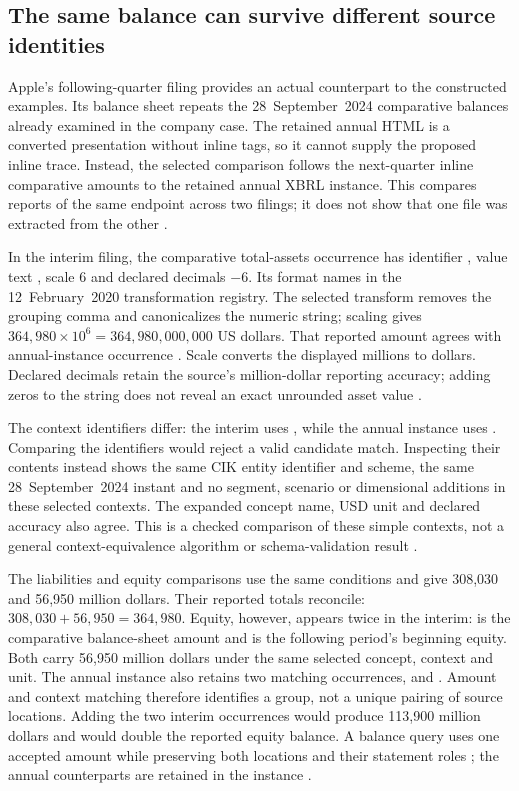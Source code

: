 \subsection{The same balance can survive different source identities}

Apple's following-quarter filing provides an actual counterpart to the
constructed examples. Its balance sheet repeats the 28~September~2024
comparative balances already examined in the company case. The retained
annual HTML is a converted presentation without inline tags, so it cannot
supply the proposed inline trace. Instead, the selected comparison follows
the next-quarter inline comparative amounts to the retained annual XBRL
instance. This compares reports of the same endpoint across two filings; it
does not show that one file was extracted from the other
\citep{apple2025q1,apple2024xbrlinstance,apple2024convertedhtml}.

In the interim filing, the comparative total-assets occurrence has identifier
, value text , scale 6 and declared decimals $-6$.
Its format names  in the 12~February~2020 transformation
registry. The selected transform removes the grouping comma and canonicalizes
the numeric string; scaling gives $364{,}980\times10^6=364{,}980{,}000{,}000$
US dollars. That reported amount agrees with annual-instance occurrence
. Scale converts the displayed millions to dollars. Declared
decimals retain the source's million-dollar reporting accuracy; adding zeros
to the string does not reveal an exact unrounded asset value
\citep{apple2025q1,apple2024xbrlinstance,arelleinlinevalues2026}.

The context identifiers differ: the interim uses , while the annual
instance uses . Comparing the identifiers would reject a valid
candidate match. Inspecting their contents instead shows the same CIK entity
identifier and scheme, the same 28~September~2024 instant and no segment,
scenario or dimensional additions in these selected contexts. The expanded
concept name, USD unit and declared accuracy also agree. This is a checked
comparison of these simple contexts, not a general context-equivalence
algorithm or schema-validation result
\citep{apple2025q1,apple2024xbrlinstance}.

The liabilities and equity comparisons use the same conditions and give
308,030 and 56,950 million dollars. Their reported totals reconcile:
$308{,}030+56{,}950=364{,}980$. Equity, however, appears twice in the interim:
 is the comparative balance-sheet amount and  is the
following period's beginning equity. Both carry 56,950 million dollars under
the same selected concept, context and unit. The annual instance also retains
two matching occurrences,  and . Amount and context
matching therefore identifies a group, not a unique pairing of source
locations. Adding the two interim occurrences would produce 113,900 million
dollars and would double the reported equity balance. A balance query uses
one accepted amount while preserving both locations and their statement roles
\citep[printed pp.~3--4]{apple2025q1}; the annual counterparts are retained in the instance \citep{apple2024xbrlinstance}.

